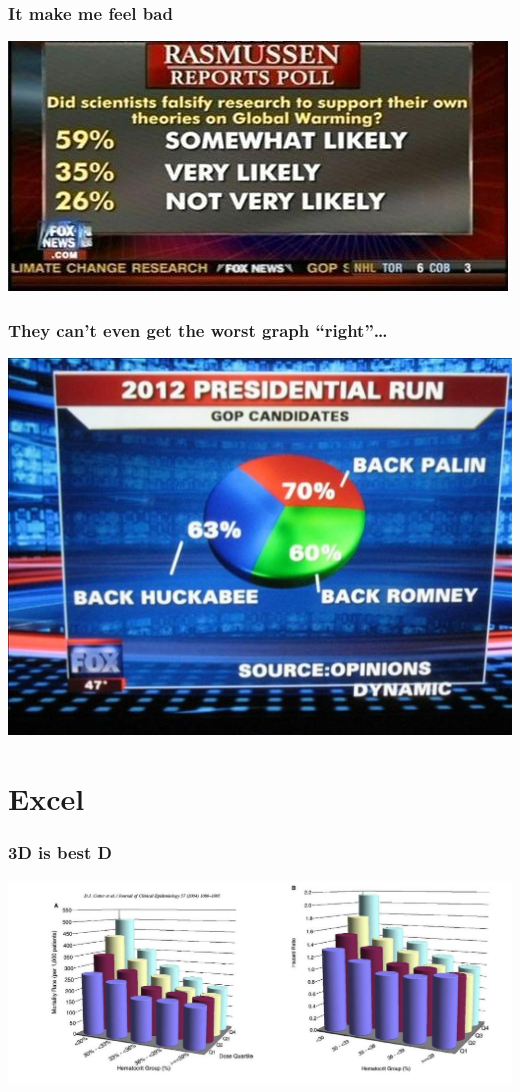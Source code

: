 \documentclass{beamer}
\begin{document}
\begin{frame}
  \frametitle{It make me feel bad}
  \includegraphics[width = \textwidth, keepaspectratio = true]{figure/fox_warming}
\end{frame}

\begin{frame}
  \frametitle{They can't even get the worst graph ``right''\ldots}
  \includegraphics[width = \textwidth, keepaspectratio = true]{figure/fox-news-piechart}
\end{frame}



\section{Excel}
\begin{frame}
  \frametitle{3D is best D}
  \includegraphics[width = \textwidth, keepaspectratio = true]{figure/cotter_fig2}
\end{frame}
\end{document}
